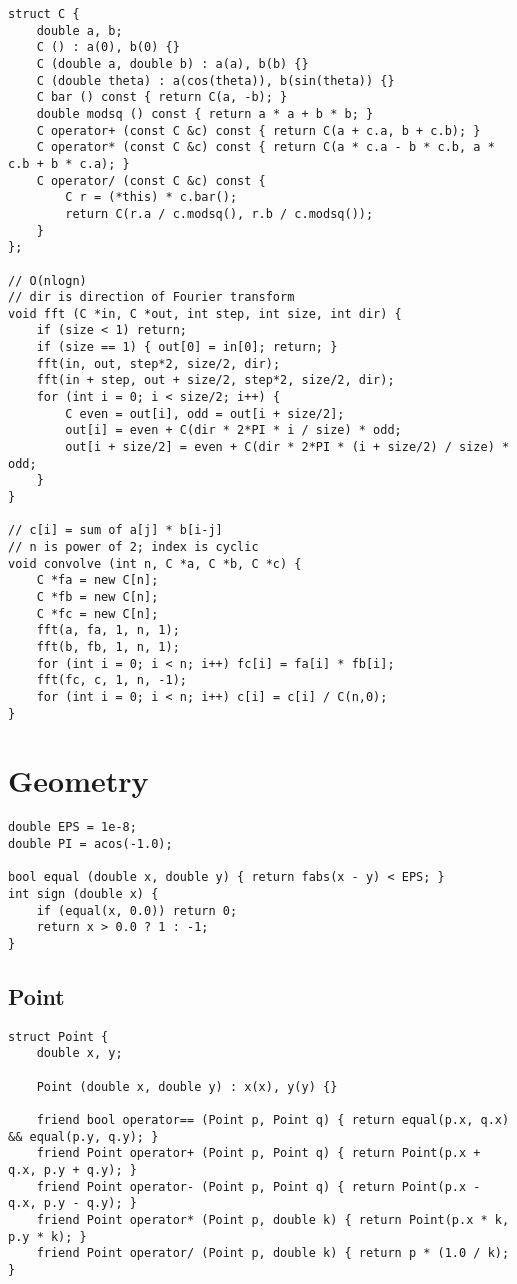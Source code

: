 \documentclass[10pt,landscape]{article}
\begin{document}
\begin{multicols}{2}
\begin{lstlisting}
struct C {
	double a, b;
	C () : a(0), b(0) {}
	C (double a, double b) : a(a), b(b) {}
	C (double theta) : a(cos(theta)), b(sin(theta)) {}
	C bar () const { return C(a, -b); }
	double modsq () const { return a * a + b * b; }
	C operator+ (const C &c) const { return C(a + c.a, b + c.b); }
	C operator* (const C &c) const { return C(a * c.a - b * c.b, a * c.b + b * c.a); }
	C operator/ (const C &c) const {
		C r = (*this) * c.bar();
		return C(r.a / c.modsq(), r.b / c.modsq());
	}
};

// O(nlogn)
// dir is direction of Fourier transform
void fft (C *in, C *out, int step, int size, int dir) {
	if (size < 1) return;
	if (size == 1) { out[0] = in[0]; return; }
	fft(in, out, step*2, size/2, dir);
	fft(in + step, out + size/2, step*2, size/2, dir);
	for (int i = 0; i < size/2; i++) {
		C even = out[i], odd = out[i + size/2];
		out[i] = even + C(dir * 2*PI * i / size) * odd;
		out[i + size/2] = even + C(dir * 2*PI * (i + size/2) / size) * odd;
	}
}

// c[i] = sum of a[j] * b[i-j]
// n is power of 2; index is cyclic
void convolve (int n, C *a, C *b, C *c) {
	C *fa = new C[n];
	C *fb = new C[n];
	C *fc = new C[n];
	fft(a, fa, 1, n, 1);
	fft(b, fb, 1, n, 1);
	for (int i = 0; i < n; i++) fc[i] = fa[i] * fb[i];
	fft(fc, c, 1, n, -1);
	for (int i = 0; i < n; i++) c[i] = c[i] / C(n,0);
}
\end{lstlisting}
\section{Geometry}
\begin{lstlisting}
double EPS = 1e-8;
double PI = acos(-1.0);

bool equal (double x, double y) { return fabs(x - y) < EPS; }
int sign (double x) {
	if (equal(x, 0.0)) return 0;
	return x > 0.0 ? 1 : -1;
}
\end{lstlisting}
\subsection{Point}
\begin{lstlisting}
struct Point {
	double x, y;

	Point (double x, double y) : x(x), y(y) {}

	friend bool operator== (Point p, Point q) { return equal(p.x, q.x) && equal(p.y, q.y); }
	friend Point operator+ (Point p, Point q) { return Point(p.x + q.x, p.y + q.y); }
	friend Point operator- (Point p, Point q) { return Point(p.x - q.x, p.y - q.y); }
	friend Point operator* (Point p, double k) { return Point(p.x * k, p.y * k); }
	friend Point operator/ (Point p, double k) { return p * (1.0 / k); }


\end{lstlisting}
\end{multicols}
\end{document}
